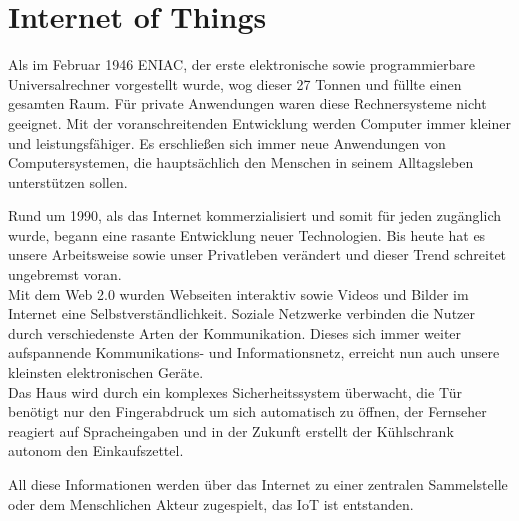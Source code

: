\chapter{Internet of Things}\label{c:IoT}

Als im Februar 1946 ENIAC, der erste elektronische sowie programmierbare Universalrechner vorgestellt wurde, wog dieser 27 Tonnen und füllte einen gesamten Raum. Für private Anwendungen waren diese Rechnersysteme nicht geeignet. Mit der voranschreitenden Entwicklung werden Computer immer kleiner und leistungsfähiger. Es erschließen sich immer neue Anwendungen von Computersystemen, die hauptsächlich den Menschen in seinem Alltagsleben unterstützen sollen.

Rund um 1990, als das Internet kommerzialisiert und somit für jeden zugänglich wurde, begann eine rasante Entwicklung neuer Technologien. Bis heute hat es unsere Arbeitsweise sowie unser Privatleben verändert und dieser Trend schreitet ungebremst voran.\\

Mit dem Web 2.0 wurden Webseiten interaktiv sowie Videos und Bilder im Internet eine Selbstverständlichkeit. 
Soziale Netzwerke verbinden die Nutzer durch verschiedenste Arten der Kommunikation. Dieses sich immer weiter aufspannende Kommunikations- und Informationsnetz, erreicht nun auch unsere kleinsten elektronischen Geräte.\\ 
Das Haus wird durch ein komplexes Sicherheitssystem überwacht, die Tür benötigt nur den Fingerabdruck um sich automatisch zu öffnen, der Fernseher reagiert auf Spracheingaben und in der Zukunft erstellt der Kühlschrank autonom den Einkaufszettel.

All diese Informationen werden über das Internet zu einer zentralen Sammelstelle oder dem Menschlichen Akteur zugespielt, das \ac{IoT} ist entstanden.






